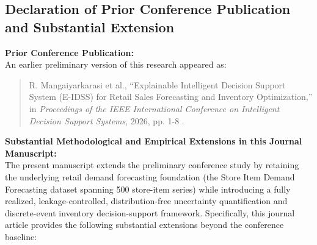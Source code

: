 
\subsection*{Declaration of Prior Conference Publication and Substantial Extension}

\noindent \textbf{Prior Conference Publication:} \\
An earlier preliminary version of this research appeared as:
\begin{quote}
\small
R. Mangaiyarkarasi et al., ``Explainable Intelligent Decision Support System (E-IDSS) for Retail Sales Forecasting and Inventory Optimization,'' in \emph{Proceedings of the IEEE International Conference on Intelligent Decision Support Systems}, 2026, pp. 1-8 \cite{e_idss_ieee}.
\end{quote}

\noindent \textbf{Substantial Methodological and Empirical Extensions in this Journal Manuscript:} \\
The present manuscript extends the preliminary conference study by retaining the underlying retail demand forecasting foundation (the Store Item Demand Forecasting dataset spanning 500 store-item series) while introducing a fully realized, leakage-controlled, distribution-free uncertainty quantification and discrete-event inventory decision-support framework. Specifically, this journal article provides the following substantial extensions beyond the conference baseline:

